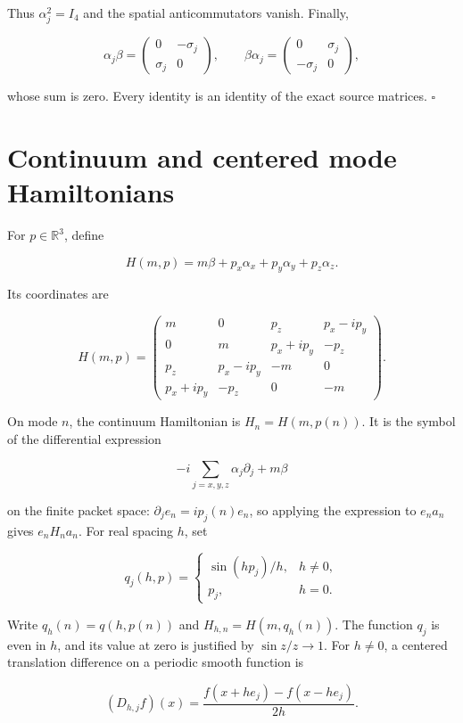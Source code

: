 Thus \(\alpha_j^2=I_4\) and the spatial anticommutators vanish. Finally,

\[
\alpha_j\beta=
\begin{pmatrix}0&-\sigma_j\\\sigma_j&0\end{pmatrix},
\qquad
\beta\alpha_j=
\begin{pmatrix}0&\sigma_j\\-\sigma_j&0\end{pmatrix},
\]

whose sum is zero. Every identity is an identity of the exact source
matrices. \(\square\)

\hypertarget{continuum-and-centered-mode-hamiltonians}{%
\section{Continuum and centered mode
Hamiltonians}\label{continuum-and-centered-mode-hamiltonians}}

For \(p\in\mathbb R^3\), define

\[
H(m,p)=m\beta+p_x\alpha_x+p_y\alpha_y+p_z\alpha_z.
\]

Its coordinates are

\[
H(m,p)=
\begin{pmatrix}
m&0&p_z&p_x-ip_y\\
0&m&p_x+ip_y&-p_z\\
p_z&p_x-ip_y&-m&0\\
p_x+ip_y&-p_z&0&-m
\end{pmatrix}.
\]

On mode \(n\), the continuum Hamiltonian is \(H_n=H(m,p(n))\). It is the
symbol of the differential expression

\[
-i\sum_{j=x,y,z}\alpha_j\partial_j+m\beta
\]

on the finite packet space: \(\partial_je_n=ip_j(n)e_n\), so applying
the expression to \(e_na_n\) gives \(e_nH_na_n\). For real spacing
\(h\), set

\[
q_j(h,p)=
\begin{cases}
\sin(hp_j)/h,&h\ne0,\\
p_j,&h=0.
\end{cases}
\]

Write \(q_h(n)=q(h,p(n))\) and \(H_{h,n}=H(m,q_h(n))\). The function
\(q_j\) is even in \(h\), and its value at zero is justified by
\(\sin z/z\to1\). For \(h\ne0\), a centered translation difference on a
periodic smooth function is

\[
(D_{h,j}f)(x)=\frac{f(x+he_j)-f(x-he_j)}{2h}.
\]

